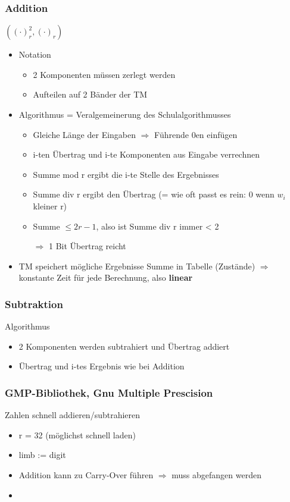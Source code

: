 \documentclass{scrartcl}
\begin{document}
\subsubsection{Addition}
$((\cdot)_r^2, (\cdot)_r)$
\begin{itemize}
\item Notation
\begin{itemize}
\item 2 Komponenten müssen zerlegt werden
\item Aufteilen auf 2 Bänder der TM
\end{itemize}
\item Algorithmus = Veralgemeinerung des Schulalgorithmusses
\begin{itemize}
\item Gleiche Länge der Eingaben $\Rightarrow$ Führende 0en einfügen
\item i-ten Übertrag und i-te Komponenten aus Eingabe verrechnen
\item Summe mod r ergibt die i-te Stelle des Ergebnisses
\item Summe div r ergibt den Übertrag (= wie oft passt es rein: 0 wenn $w_i$ kleiner r)
\item Summe $\leq 2r-1$, also ist Summe div r immer < 2
\item[$\Rightarrow$] 1 Bit Übertrag reicht
\end{itemize}
\item TM speichert mögliche Ergebnisse Summe in Tabelle (Zustände) $\Rightarrow$ konstante Zeit für jede Berechnung, also \textbf{linear}
\end{itemize}



\subsubsection{Subtraktion}
Algorithmus
\begin{itemize}
\item 2 Komponenten werden subtrahiert und Übertrag addiert
\item Übertrag und i-tes Ergebnis wie bei Addition
\end{itemize}


\subsubsection{GMP-Bibliothek, Gnu Multiple Prescision}
Zahlen schnell addieren/subtrahieren
\begin{itemize}
\item r = 32 (möglichst schnell laden)
\item limb := digit
\item Addition kann zu Carry-Over führen $\Rightarrow$ muss abgefangen werden
\item 
\end{itemize}
\end{document}
